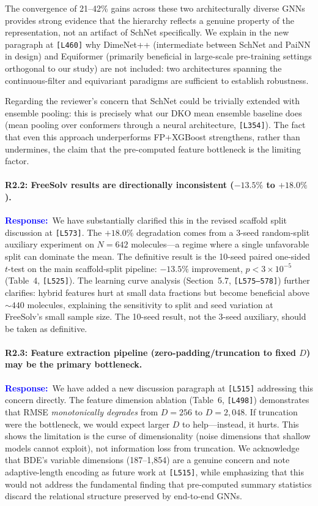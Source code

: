 \documentclass[11pt]{article}
\newcommand{\point}[1]{\paragraph{#1}}
\newcommand{\response}{\textcolor{blue}{\textbf{Response:}}~}
\newcommand{\lines}[1]{\texttt{[L#1]}}
\begin{document}
The convergence of 21--42\% gains across these two architecturally diverse GNNs provides strong evidence that the hierarchy reflects a genuine property of the representation, not an artifact of SchNet specifically. We explain in the new paragraph at \lines{460} why DimeNet++ (intermediate between SchNet and PaiNN in design) and Equiformer (primarily beneficial in large-scale pre-training settings orthogonal to our study) are not included: two architectures spanning the continuous-filter and equivariant paradigms are sufficient to establish robustness.

Regarding the reviewer's concern that SchNet could be trivially extended with ensemble pooling: this is precisely what our DKO mean ensemble baseline does (mean pooling over conformers through a neural architecture, \lines{354}). The fact that even this approach underperforms FP+XGBoost strengthens, rather than undermines, the claim that the pre-computed feature bottleneck is the limiting factor.

\point{R2.2: FreeSolv results are directionally inconsistent ($-13.5\%$ to $+18.0\%$).}

\response We have substantially clarified this in the revised scaffold split discussion at \lines{573}. The $+18.0\%$ degradation comes from a 3-seed random-split auxiliary experiment on $N{=}642$ molecules---a regime where a single unfavorable split can dominate the mean. The definitive result is the 10-seed paired one-sided $t$-test on the main scaffold-split pipeline: $-13.5\%$ improvement, $p < 3 \times 10^{-5}$ (Table~4, \lines{525}). The learning curve analysis (Section~5.7, \lines{575--578}) further clarifies: hybrid features hurt at small data fractions but become beneficial above ${\sim}440$ molecules, explaining the sensitivity to split and seed variation at FreeSolv's small sample size. The 10-seed result, not the 3-seed auxiliary, should be taken as definitive.

\point{R2.3: Feature extraction pipeline (zero-padding/truncation to fixed $D$) may be the primary bottleneck.}

\response We have added a new discussion paragraph at \lines{515} addressing this concern directly. The feature dimension ablation (Table~6, \lines{498}) demonstrates that RMSE \emph{monotonically degrades} from $D{=}256$ to $D{=}2{,}048$. If truncation were the bottleneck, we would expect larger $D$ to help---instead, it hurts. This shows the limitation is the curse of dimensionality (noise dimensions that shallow models cannot exploit), not information loss from truncation. We acknowledge that BDE's variable dimensions (187--1,854) are a genuine concern and note adaptive-length encoding as future work at \lines{515}, while emphasizing that this would not address the fundamental finding that pre-computed summary statistics discard the relational structure preserved by end-to-end GNNs.
\end{document}
